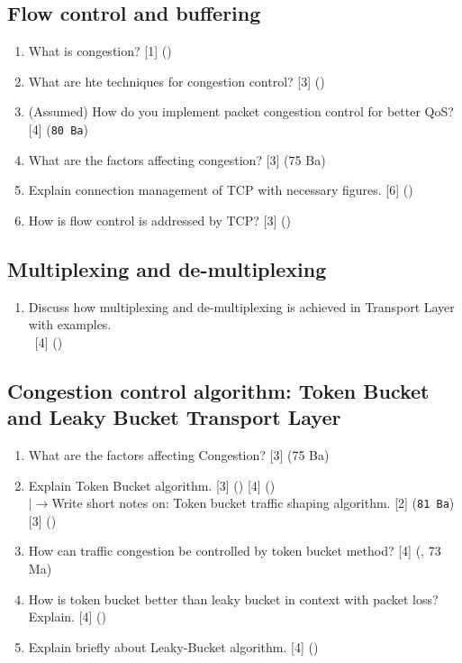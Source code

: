 \documentclass[12pt]{article}
\newcommand{\lb}{\\$\left|\rightarrow\right.$}
\newcommand{\enter}{\\\textcolor{white}{1}}
\begin{document}
	\subsection{Flow control and buffering}
		\begin{enumerate}[noitemsep, topsep=0pt]
			\item What is congestion? \hfill [1] ()

			\item What are hte techniques for congestion control? \hfill [3] ()

			\item (Assumed) How do you implement packet congestion control for better QoS? \hfill [4] (\texttt{80 Ba})

			\item What are the factors affecting congestion? \hfill [3] (75 Ba)

			\item Explain connection management of TCP with necessary figures. \hfill [6] ()

			\item How is flow control is addressed by TCP? \hfill [3] ()
		\end{enumerate}

	\subsection{Multiplexing and de-multiplexing}
		\begin{enumerate}[noitemsep, topsep=0pt]
			\item Discuss how multiplexing and de-multiplexing is achieved in Transport Layer with examples.
			\enter\hfill [4] ()
		\end{enumerate}

	\subsection{Congestion control algorithm: Token Bucket and Leaky Bucket Transport Layer}
		\begin{enumerate}[noitemsep, topsep=0pt]
			\item What are the factors affecting Congestion? \hfill [3] (75 Ba)

			\item Explain Token Bucket algorithm. \hfill [3] () [4] ()
			\lb Write short notes on: Token bucket traffic shaping algorithm. \hfill [2] (\texttt{81 Ba}) [3] ()

			\item How can traffic congestion be controlled by token bucket method? \hfill [4] (, 73 Ma)

			\item How is token bucket better than leaky bucket in context with packet loss? Explain. \hfill [4] ()

			\item Explain briefly about Leaky-Bucket algorithm. \hfill [4] ()
		\end{enumerate}
\end{document}
